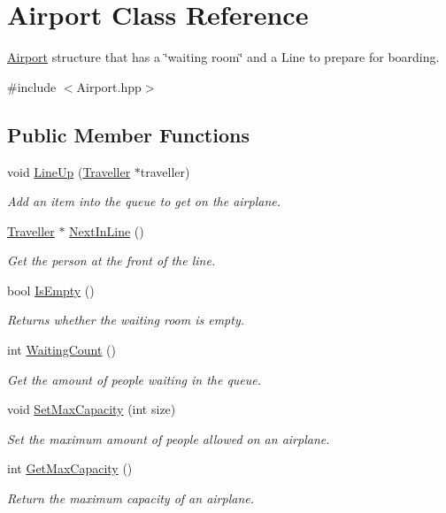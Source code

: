 \hypertarget{classAirport}{}\section{Airport Class Reference}
\label{classAirport}


\hyperlink{classAirport}{Airport} structure that has a \char`\"{}waiting room\char`\"{} and a Line to prepare for boarding.  




{\ttfamily \#include $<$Airport.\+hpp$>$}

\subsection*{Public Member Functions}
\begin{DoxyCompactItemize}
\item 
void \hyperlink{classAirport_abe869ad0bd58b241cf6e455007fbaca8}{Line\+Up} (\hyperlink{structTraveller}{Traveller} $\ast$traveller)
\begin{DoxyCompactList}\small\item\em Add an item into the queue to get on the airplane. \end{DoxyCompactList}\item 
\hyperlink{structTraveller}{Traveller} $\ast$ \hyperlink{classAirport_aa1cd4de531d494c16aef7c864ad16dca}{Next\+In\+Line} ()
\begin{DoxyCompactList}\small\item\em Get the person at the front of the line. \end{DoxyCompactList}\item 
bool \hyperlink{classAirport_ae8c1c9ef085f6799e63390cc2d7588a5}{Is\+Empty} ()
\begin{DoxyCompactList}\small\item\em Returns whether the waiting room is empty. \end{DoxyCompactList}\item 
int \hyperlink{classAirport_aafde8dfddb8db389d4855ed18db68ac2}{Waiting\+Count} ()
\begin{DoxyCompactList}\small\item\em Get the amount of people waiting in the queue. \end{DoxyCompactList}\item 
void \hyperlink{classAirport_a74be9f6b0f8c6988319f55f1b6e13b41}{Set\+Max\+Capacity} (int size)
\begin{DoxyCompactList}\small\item\em Set the maximum amount of people allowed on an airplane. \end{DoxyCompactList}\item 
int \hyperlink{classAirport_a56e6af4ae399019ac607f49c592a1afc}{Get\+Max\+Capacity} ()
\begin{DoxyCompactList}\small\item\em Return the maximum capacity of an airplane. \end{DoxyCompactList}\end{DoxyCompactItemize}


